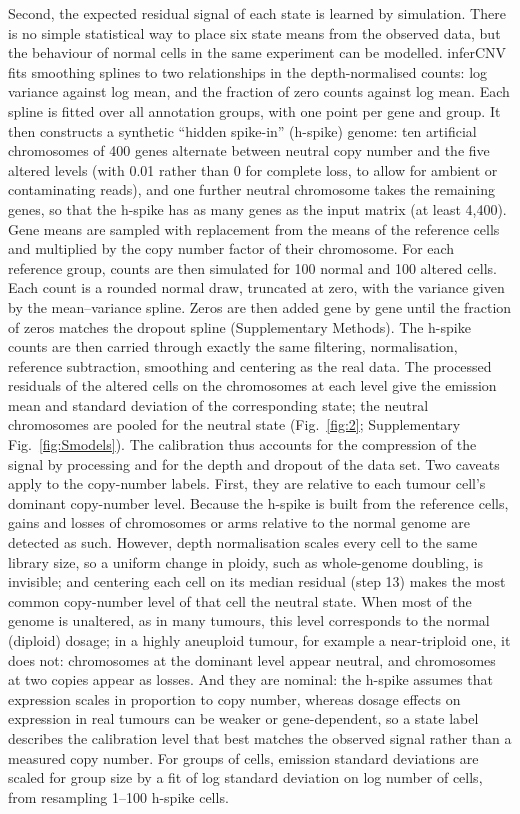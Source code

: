 Second, the expected residual signal of each state is learned by simulation. There is no simple statistical way to place six state means from the observed data, but the behaviour of normal cells in the same experiment can be modelled. inferCNV fits smoothing splines to two relationships in the depth-normalised counts: log variance against log mean, and the fraction of zero counts against log mean. Each spline is fitted over all annotation groups, with one point per gene and group. It then constructs a synthetic ``hidden spike-in'' (h-spike) genome: ten artificial chromosomes of 400 genes alternate between neutral copy number and the five altered levels (with 0.01 rather than 0 for complete loss, to allow for ambient or contaminating reads), and one further neutral chromosome takes the remaining genes, so that the h-spike has as many genes as the input matrix (at least 4,400). Gene means are sampled with replacement from the means of the reference cells and multiplied by the copy number factor of their chromosome. For each reference group, counts are then simulated for 100 normal and 100 altered cells. Each count is a rounded normal draw, truncated at zero, with the variance given by the mean--variance spline. Zeros are then added gene by gene until the fraction of zeros matches the dropout spline (Supplementary Methods). The h-spike counts are then carried through exactly the same filtering, normalisation, reference subtraction, smoothing and centering as the real data. The processed residuals of the altered cells on the chromosomes at each level give the emission mean and standard deviation of the corresponding state; the neutral chromosomes are pooled for the neutral state (Fig.~\ref{fig:2}; Supplementary Fig.~\ref{fig:Smodels}). The calibration thus accounts for the compression of the signal by processing and for the depth and dropout of the data set. Two caveats apply to the copy-number labels. First, they are relative to each tumour cell's dominant copy-number level. Because the h-spike is built from the reference cells, gains and losses of chromosomes or arms relative to the normal genome are detected as such. However, depth normalisation scales every cell to the same library size, so a uniform change in ploidy, such as whole-genome doubling, is invisible; and centering each cell on its median residual (step 13) makes the most common copy-number level of that cell the neutral state. When most of the genome is unaltered, as in many tumours, this level corresponds to the normal (diploid) dosage; in a highly aneuploid tumour, for example a near-triploid one, it does not: chromosomes at the dominant level appear neutral, and chromosomes at two copies appear as losses. And they are nominal: the h-spike assumes that expression scales in proportion to copy number, whereas dosage effects on expression in real tumours can be weaker or gene-dependent, so a state label describes the calibration level that best matches the observed signal rather than a measured copy number. For groups of cells, emission standard deviations are scaled for group size by a fit of log standard deviation on log number of cells, from resampling 1--100 h-spike cells.

